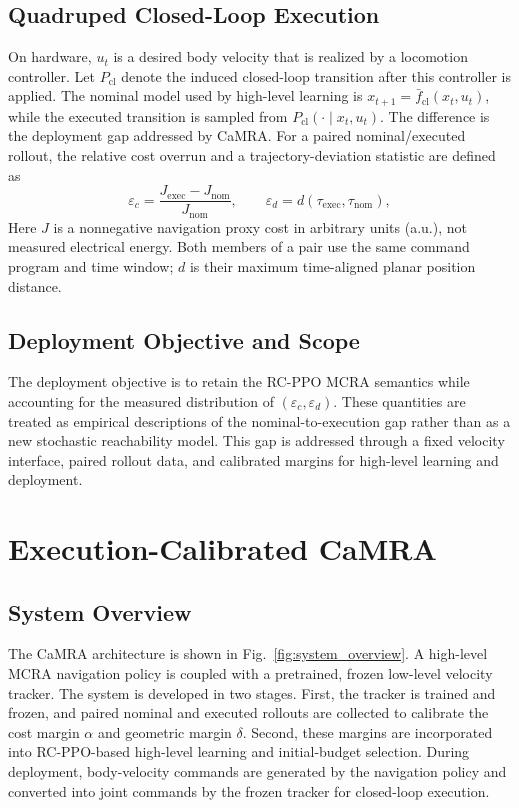 \documentclass[conference]{IEEEtran}
\begin{document}
\subsection{Quadruped Closed-Loop Execution}
On hardware, $u_t$ is a desired body velocity that is realized by a locomotion
controller. Let $P_{\mathrm{cl}}$ denote the induced closed-loop transition after
this controller is applied. The nominal model used by high-level learning is
$x_{t+1}=\bar f_{\mathrm{cl}}(x_t,u_t)$, while the executed transition is sampled
from $P_{\mathrm{cl}}(\cdot\mid x_t,u_t)$. The difference is the deployment gap
addressed by CaMRA. For a paired nominal/executed rollout, the relative
cost overrun and a trajectory-deviation statistic are defined as
\begin{equation}
\varepsilon_c=\frac{J_{\mathrm{exec}}-J_{\mathrm{nom}}}{J_{\mathrm{nom}}},
\qquad
\varepsilon_d=d(\tau_{\mathrm{exec}},\tau_{\mathrm{nom}}),
\end{equation}
Here $J$ is a nonnegative navigation proxy cost in arbitrary units (a.u.),
not measured electrical energy. Both members of a pair use the same command
program and time window; $d$ is their maximum time-aligned planar position
distance.

\subsection{Deployment Objective and Scope}
The deployment objective is to retain the RC-PPO MCRA semantics while accounting
for the measured distribution of $(\varepsilon_c,\varepsilon_d)$. These quantities
are treated as empirical descriptions of the nominal-to-execution gap rather
than as a new stochastic reachability model. This gap is addressed through a
fixed velocity interface, paired rollout data, and calibrated margins for
high-level learning and deployment.

\section{Execution-Calibrated CaMRA}
\subsection{System Overview}
The CaMRA architecture is shown in Fig.~\ref{fig:system_overview}. A high-level
MCRA navigation policy is coupled with a pretrained, frozen low-level velocity
tracker. The system is developed in two stages. First, the tracker is trained and
frozen, and paired nominal and executed rollouts are collected to calibrate the
cost margin $\alpha$ and geometric margin $\delta$. Second, these margins are
incorporated into RC-PPO-based high-level learning and initial-budget selection.
During deployment, body-velocity commands are generated by the navigation policy
and converted into joint commands by the frozen tracker for closed-loop execution.
\end{document}
